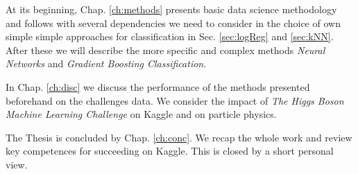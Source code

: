 At its beginning, Chap. \ref{ch:methods} presents basic data science methodology and follows with several dependencies we need to consider in the choice of own simple simple approaches for classification in Sec. \ref{sec:logReg} and \ref{sec:kNN}. After these we will describe the more specific and complex methods \emph{Neural Networks} and \emph{Gradient Boosting Classification}.

In Chap. \ref{ch:disc} we discuss the performance of the methods presented beforehand on the challenges data. We consider the impact of \emph{The Higgs Boson Machine Learning Challenge} on Kaggle and on particle physics.

The Thesis is concluded by Chap. \ref{ch:conc}. We recap the whole work and review key competences for succeeding on Kaggle.
This is closed by a short personal view.
\pagebreak
\clearpage

	{\pagebreak \thispagestyle{empty} \cleardoublepage}{\clearpage}